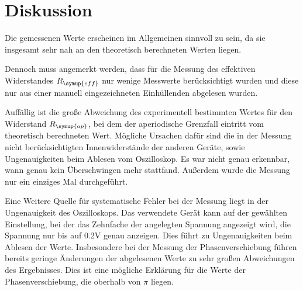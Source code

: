 \section{Diskussion}
\label{sec:Diskussion}
Die gemessenen Werte erscheinen im Allgemeinen sinnvoll zu sein, da sie insgesamt
sehr nah an den theoretisch berechneten Werten liegen.

Dennoch muss angemerkt werden, dass für die Messung des effektiven Widerstandes $R_{\symup{eff}}$
nur wenige Messwerte berücksichtigt wurden und diese nur aus einer manuell eingezeichneten
Einhüllenden abgelesen wurden.

Auffällig ist die große Abweichung des experimentell bestimmten Wertes für den
Widerstand $R_{\symup{ap}}$, bei dem der aperiodische Grenzfall eintritt vom theoretisch
berechneten Wert. Mögliche Ursachen dafür sind die in der Messung nicht berücksichtigten
Innenwiderstände der anderen Geräte, sowie Ungenauigkeiten beim Ablesen vom Oszilloskop.
Es war nicht genau erkennbar, wann genau kein Überschwingen mehr stattfand. Außerdem
wurde die Messung nur ein einziges Mal durchgeführt.

Eine Weitere Quelle für systematische Fehler bei der Messung liegt in der Ungenauigkeit
des Oszilloskops. Das verwendete Gerät kann auf der gewählten Einstellung, bei der
das Zehnfache der angelegten Spannung angezeigt wird, die Spannung nur bis auf 0.2V genau
anzeigen. Dies führt zu Ungenauigkeiten beim Ablesen der Werte. Insbesondere
bei der Messung der Phasenverschiebung führen bereits geringe Änderungen der abgelesenen
Werte zu sehr großen Abweichungen des Ergebnisses. Dies ist eine mögliche Erklärung
für die Werte der Phasenverschiebung, die oberhalb von $\pi$ liegen.
